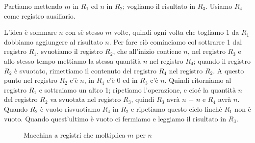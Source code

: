 \begin{esempio}
    Partiamo mettendo \( m \) in \( R_1 \) ed \( n \) in \( R_2 \);
    vogliamo il risultato in \( R_3 \). Usiamo \( R_4 \) come registro
    ausiliario.

    L'idea \`e sommare \( n \) con s\`e stesso \( m \) volte, quindi
    ogni volta che togliamo 1 da \( R_1 \) dobbiamo aggiungere al
    risultato \( n \). Per fare ci\`o cominciamo col sottrarre 1 dal
    registro \( R_1 \), svuotiamo il registro \( R_2 \), che
    all'inizio contiene \( n \), nel registro \( R_3 \) e allo stesso
    tempo mettiamo la stessa quantit\`a \( n \) nel registro \( R_4
    \); quando il registro \( R_2 \) \`e svuotato, rimettiamo il
    contenuto del registro \( R_4 \) nel registro \( R_2 \). A questo
    punto nel registro \( R_2 \) c'\`e \( n \), in \( R_4 \) c'\`e 0
    ed in \( R_3 \) c'\`e \( n \). Quindi ritorniamo al registro \(
    R_1 \) e sottraiamo un altro 1; ripetiamo l'operazione, e cio\'e
    la quantit\`a \( n \) del registro \( R_2 \) va svuotata nel
    registro \( R_3 \), quindi \( R_3 \) avr\`a \( n \) + \( n \) e \(
    R_4 \) avr\`a \( n \). Quando \( R_2 \) \`e vuoto risvuotiamo \(
    R_4 \) in \( R_2 \) e ripetiamo questo ciclo finch\'e \( R_1 \)
    non \`e vuoto. Quando quest'ultimo \`e vuoto ci fermiamo e
    leggiamo il risultato in \( R_3 \).

    \begin{figure}[hbtp]
    \hspace{0cm}
    \caption{Macchina a registri che moltiplica \( m \) per \( n \)}
    \end{figure}

\end{esempio}

